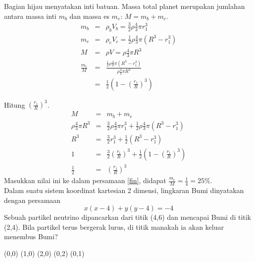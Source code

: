 \documentclass[11pt,fleqn]{exam}
\begin{document}
\begin{questions}
\noindent Bagian hijau menyatakan inti batuan. Massa total planet merupakan jumlahan antara massa inti $m_b$ dan massa es $m_e$: $M=m_b+m_e$.
\begin{eqnarray}
m_b&=&\rho_b V_b=\frac{3}{2}\rho \frac{4}{3}\pi r_1^3 \nonumber \\
m_e&=&\rho_e V_e=\frac{1}{2}\rho \frac{4}{3}\pi (R^3-r_1^3) \nonumber \\
M&=&\rho V=\rho \frac{4}{3}\pi R^3 \nonumber \\
\frac{m_e}{M}&=&\frac{\frac{1}{2}\rho \frac{4}{3}\pi (R^3-r_1^3)}{\rho \frac{4}{3}\pi R^3} \nonumber \\
 &=& \frac{1}{2}\left(1-\left(\frac{r_1}{R}\right)^3\right) \label{fin}
\end{eqnarray}

\noindent Hitung $\left(\frac{r_1}{R}\right)^3$.
\begin{eqnarray}
M&=&m_b+m_e \nonumber \\
\rho \frac{4}{3}\pi R^3&=&\frac{3}{2}\rho \frac{4}{3}\pi r_1^3+\frac{1}{2}\rho \frac{4}{3}\pi (R^3-r_1^3) \nonumber \\
R^3&=&\frac{3}{2}r_1^3+\frac{1}{2}(R^3-r_1^3) \nonumber \\
1&=&\frac{3}{2}\left(\frac{r_1}{R}\right)^3+\frac{1}{2}\left(1-\left(\frac{r_1}{R}\right)^3\right) \nonumber \\
\frac{1}{2}&=&\left(\frac{r_1}{R}\right)^3
\end{eqnarray}
\noindent Masukkan nilai ini ke dalam persamaan \autoref{fin}, didapat $\frac{m_e}{M}=\frac{1}{4}=25\%$.\\


\question Dalam suatu sistem koordinat kartesian 2 dimensi, lingkaran Bumi dinyatakan dengan persamaan
\begin{equation*}
x(x-4)+y(y-4)=-4
\end{equation*}
\noindent Sebuah partikel neutrino dipancarkan dari titik (4,6) dan mencapai Bumi di titik (2,4). Bila partikel terus bergerak lurus, di titik manakah ia akan keluar menembus Bumi?
\begin{choices}
\choice (0,0)
\choice (1,0)
\choice (2,0)
\choice (0,2)
\choice (0,1)
\end{choices}


\end{questions}
\end{document}
